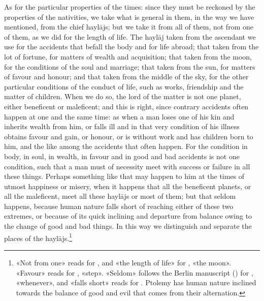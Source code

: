 \documentclass[11pt]{article}
\newcommand{\Fol}[1]{\marginpar{\footnotesize\color{gray}f.\,#1}}
\begin{document}
\par \Fol{77r}As for the particular properties of the times: since they must be reckoned by the properties of the nativities, we take what is general in them, in the way we have mentioned, from the chief haylājs; but we take it from all of them, not from one of them, as we did for the length of life. The haylāj taken from the ascendant we use for the accidents that befall the body and for life abroad; that taken from the lot of fortune, for matters of wealth and acquisition; that taken from the moon, for the conditions of the soul and marriage; that taken from the sun, for matters of favour and honour; and that taken from the middle of the sky, for the other particular conditions of the conduct of life, such as works, friendship and the matter of children. When we do so, the lord of the matter is not one planet, either beneficent or maleficent; and this is right, since contrary accidents often happen at one and the same time: as when a man loses one of his kin and inherits wealth from him, or falls ill and in that very condition of his illness obtains favour and gain, or honour, or is without work and has children born to him, and the like among the accidents that often happen. For the condition in body, in soul, in wealth, in favour and in good and bad accidents is not one condition, such that a man must of necessity meet with success or failure in all these things. Perhaps something like that may happen to him at the times of utmost happiness or misery, when it happens that all the beneficent planets, or all the maleficent, meet all these haylājs or most of them; but that seldom happens, because human nature falls short of reaching either of these two extremes, or because of its quick inclining and departure from balance owing to the change of good and bad things. In this way we distinguish and separate the places of the haylājs.\footnote{«Not from one» reads  for , and «the length of life»  for , «the moon». «Favour» reads  for , «step». «Seldom» follows the Berlin manuscript () for , «whenever», and «falls short» reads  for . Ptolemy has human nature inclined towards the balance of good and evil that comes from their alternation.}\par
\end{document}
